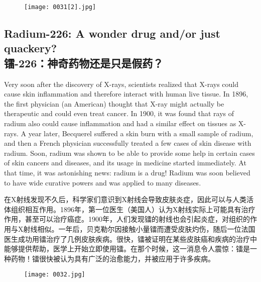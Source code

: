 \documentclass[dvipsnames, svgnames,a4paper,11pt]{article}
\begin{document}
\begin{figure}[htbp]
      \centering
      \texttt{[image: 0031[2].jpg]}
       \label{fig18}
\end{figure}

\subsection{Radium-226: A wonder drug and/or just quackery?\\镭-226：神奇药物还是只是假药？}
Very soon after the discovery of X-rays, scientists realized that X-rays could cause skin inflammation and therefore interact with human live tissue. In 1896, the first physician (an American) thought that X-ray might actually be therapeutic and could even treat cancer. In 1900, it was found that rays of radium also could cause inflammation and had a similar effect on tissues as X-rays. A year later, Becquerel suffered a skin burn with a small sample of radium, and then a French physician successfully treated a few cases of skin disease with radium. Soon, radium was shown to be able to provide some help in certain cases of skin cancers and diseases, and its usage in medicine started immediately. At that time, it was astonishing news: radium is a drug! Radium was soon believed to have wide curative powers and was applied to many diseases.

在X射线发现不久后，科学家们意识到X射线会导致皮肤炎症，因此可以与人类活体组织相互作用。1896年，第一位医生（美国人）认为X射线实际上可能具有治疗作用，甚至可以治疗癌症。1900年，人们发现镭的射线也会引起炎症，对组织的作用与X射线相似。一年后，贝克勒尔因接触小量镭而遭受皮肤灼伤，随后一位法国医生成功用镭治疗了几例皮肤疾病。很快，镭被证明在某些皮肤癌和疾病的治疗中能够提供帮助，医学上开始立即使用镭。在那个时候，这一消息令人震惊：镭是一种药物！镭很快被认为具有广泛的治愈能力，并被应用于许多疾病。

\begin{figure}[htbp]
      \centering
      \texttt{[image: 0032.jpg]}
       \label{fig19}
\end{figure}
\end{document}
